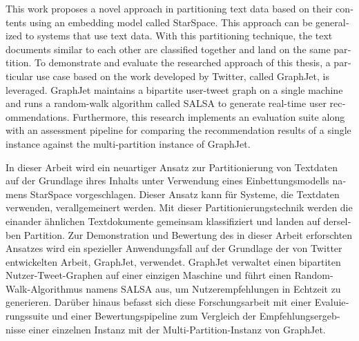 
\null\vfil
\begin{otherlanguage}{english}
\begin{center}\textsf{\textbf{\abstractname}}\end{center}

\noindent This work proposes a novel approach in partitioning text data based on their contents using an embedding model called StarSpace. This approach can be generalized to systems that use text data. With this partitioning technique, the text documents similar to each other are classified together and land on the same partition. To demonstrate and evaluate the researched approach of this thesis, a particular use case based on the work developed by Twitter, called GraphJet, is leveraged. GraphJet maintains a bipartite user-tweet graph on a single machine and runs a random-walk algorithm called SALSA to generate real-time user recommendations. Furthermore, this research implements an evaluation suite along with an assessment pipeline for comparing the recommendation results of a single instance against the multi-partition instance of GraphJet.

\end{otherlanguage}
\vfil\null



\null\vfil
\begin{otherlanguage}{ngerman}
\begin{center}\textsf{\textbf{\abstractname}}\end{center}

\noindent In dieser Arbeit wird ein neuartiger Ansatz zur Partitionierung von Textdaten auf der Grundlage ihres Inhalts unter Verwendung eines Einbettungsmodells namens StarSpace vorgeschlagen. Dieser Ansatz kann für Systeme, die Textdaten verwenden, verallgemeinert werden. Mit dieser Partitionierungstechnik werden die einander ähnlichen Textdokumente gemeinsam klassifiziert und landen auf derselben Partition. Zur Demonstration und Bewertung des in dieser Arbeit erforschten Ansatzes wird ein spezieller Anwendungsfall auf der Grundlage der von Twitter entwickelten Arbeit, GraphJet, verwendet. GraphJet verwaltet einen bipartiten Nutzer-Tweet-Graphen auf einer einzigen Maschine und führt einen Random-Walk-Algorithmus namens SALSA aus, um Nutzerempfehlungen in Echtzeit zu generieren. Darüber hinaus befasst sich diese Forschungsarbeit mit einer Evaluierungssuite und einer Bewertungspipeline zum Vergleich der Empfehlungsergebnisse einer einzelnen Instanz mit der Multi-Partition-Instanz von GraphJet.



\end{otherlanguage}
\vfil\null



